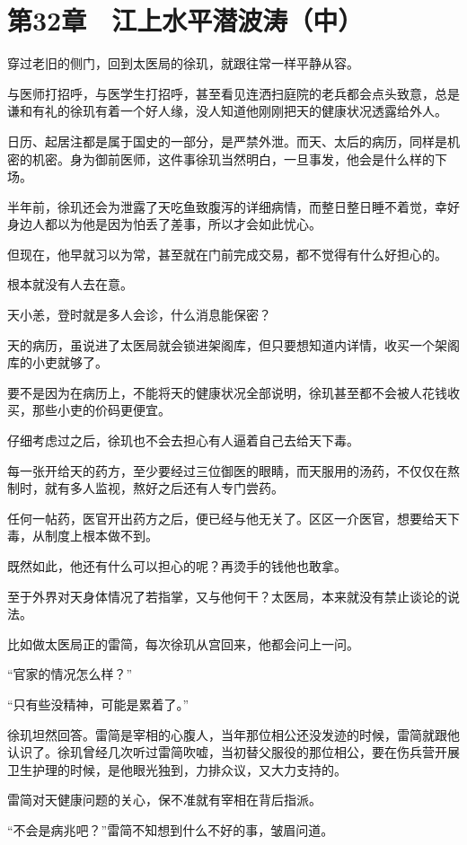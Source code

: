 \section{第32章　江上水平潜波涛（中）}

穿过老旧的侧门，回到太医局的徐玑，就跟往常一样平静从容。

与医师打招呼，与医学生打招呼，甚至看见连洒扫庭院的老兵都会点头致意，总是谦和有礼的徐玑有着一个好人缘，没人知道他刚刚把天的健康状况透露给外人。

日历、起居注都是属于国史的一部分，是严禁外泄。而天、太后的病历，同样是机密的机密。身为御前医师，这件事徐玑当然明白，一旦事发，他会是什么样的下场。

半年前，徐玑还会为泄露了天吃鱼致腹泻的详细病情，而整日整日睡不着觉，幸好身边人都以为他是因为怕丢了差事，所以才会如此忧心。

但现在，他早就习以为常，甚至就在门前完成交易，都不觉得有什么好担心的。

根本就没有人去在意。

天小恙，登时就是多人会诊，什么消息能保密？

天的病历，虽说进了太医局就会锁进架阁库，但只要想知道内详情，收买一个架阁库的小吏就够了。

要不是因为在病历上，不能将天的健康状况全部说明，徐玑甚至都不会被人花钱收买，那些小吏的价码更便宜。

仔细考虑过之后，徐玑也不会去担心有人逼着自己去给天下毒。

每一张开给天的药方，至少要经过三位御医的眼睛，而天服用的汤药，不仅仅在熬制时，就有多人监视，熬好之后还有人专门尝药。

任何一帖药，医官开出药方之后，便已经与他无关了。区区一介医官，想要给天下毒，从制度上根本做不到。

既然如此，他还有什么可以担心的呢？再烫手的钱他也敢拿。

至于外界对天身体情况了若指掌，又与他何干？太医局，本来就没有禁止谈论的说法。

比如做太医局正的雷简，每次徐玑从宫回来，他都会问上一问。

“官家的情况怎么样？”

“只有些没精神，可能是累着了。”

徐玑坦然回答。雷简是宰相的心腹人，当年那位相公还没发迹的时候，雷简就跟他认识了。徐玑曾经几次听过雷简吹嘘，当初替父服役的那位相公，要在伤兵营开展卫生护理的时候，是他眼光独到，力排众议，又大力支持的。

雷简对天健康问题的关心，保不准就有宰相在背后指派。

“不会是病兆吧？”雷简不知想到什么不好的事，皱眉问道。

